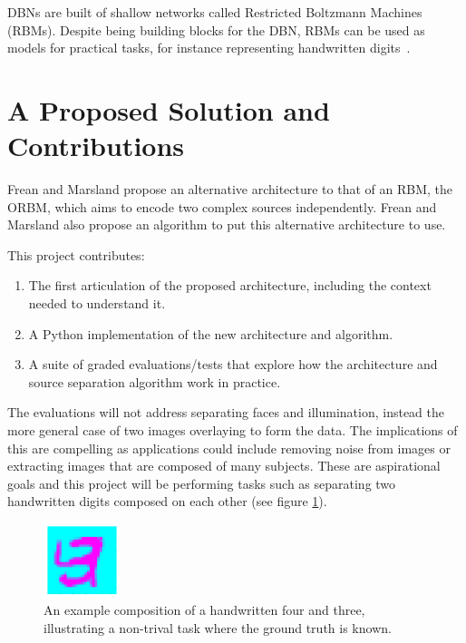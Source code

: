 DBNs are built of shallow networks called Restricted Boltzmann Machines (RBMs). Despite being building blocks for the DBN, RBMs can be used as models for practical tasks, for instance representing handwritten digits~\cite{fischer2014training}.

\section{A Proposed Solution and Contributions}

Frean and Marsland propose an alternative architecture to that of an RBM, the ORBM, which aims to encode two complex sources independently. Frean and Marsland also propose an algorithm to put this alternative architecture to use.

This project contributes:
\begin{enumerate}[$\mathcal{C}$1.]
  \item\label{item-c1} The first articulation of the proposed architecture, including the context needed to understand it.
  \item\label{item-c2} A Python implementation of the new architecture and algorithm.
  \item\label{item-c3} A suite of graded evaluations/tests that explore how the architecture and source separation algorithm work in practice.
\end{enumerate}
The evaluations will not address separating faces and illumination, instead the more general case of two images overlaying to form the data. The implications of this are compelling as applications could include removing noise from images or extracting images that are composed of many subjects. These are aspirational goals and this project will be performing tasks such as separating two handwritten digits composed on each other (see figure \ref{F:Composition-Example}).

\begin{figure}[h]
\begin{center}
  \includegraphics[width = 0.2\textwidth]{Assets/composition-example.png}
\caption{An example composition of a handwritten four and three, illustrating a non-trival task where the ground truth is known.}
\label{F:Composition-Example}
\end{center}
\end{figure}


